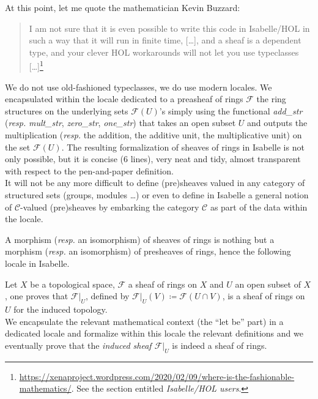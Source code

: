 \documentclass[12pt]{scrartcl}
\begin{document}
 
At this point, let me quote the mathematician Kevin Buzzard:
\begin{quote}
	I am not sure that it is even possible to write this code in Isabelle/HOL in such a way that it will run in finite time, [\dots], and a sheaf is a dependent type, and your clever HOL workarounds will not let you use typeclasses [\dots]\footnote{\url{https://xenaproject.wordpress.com/2020/02/09/where-is-the-fashionable-mathematics/}. See the section entitled \textit{Isabelle/HOL users}.}
\end{quote}

We do not use old-fashioned typeclasses, we do use modern locales. We encapsulated within the locale dedicated to a preasheaf of rings $\mathscr{F}$ the ring structures on the underlying sets $\mathscr{F}(U)$'s simply using the functional \textit{add\_str} (\textit{resp.} \textit{mult\_str}, \textit{zero\_str}, \textit{one\_str}) that takes an open subset $U$ and outputs the multiplication (\textit{resp.} the addition, the additive unit, the multiplicative unit) on the set $\mathscr{F}(U)$. The resulting formalization of sheaves of rings in Isabelle is not only possible, but it is concise (6 lines), very neat and tidy, almost transparent with respect to the pen-and-paper definition. \\
It will not be any more difficult to define (pre)sheaves valued in any category of structured sets (groups, modules \dots) or even to define in Isabelle a general notion of $\mathscr{C}$-valued (pre)sheaves by embarking the category $\mathscr{C}$ as part of the data within the locale.  	


A morphism (\textit{resp.} an isomorphism) of sheaves of rings is nothing but a morphism (\textit{resp.} an isomorphism) of presheaves of rings, hence the following locale in Isabelle.


Let $X$ be a topological space, $\mathscr{F}$ a sheaf of rings on $X$ and $U$ an open subset of $X$,  one proves that $\mathscr{F}|_U$, defined by $\mathscr{F}|_U(V) \coloneqq \mathscr{F}(U \cap V)$, is a sheaf of rings on $U$ for the induced topology. \\
We encapsulate the relevant mathematical context (the ``let be'' part) in a dedicated locale and formalize within this locale the relevant definitions and we eventually prove  that the \emph{induced sheaf $\mathscr{F}|_U$} is indeed a sheaf of rings.
\end{document}
